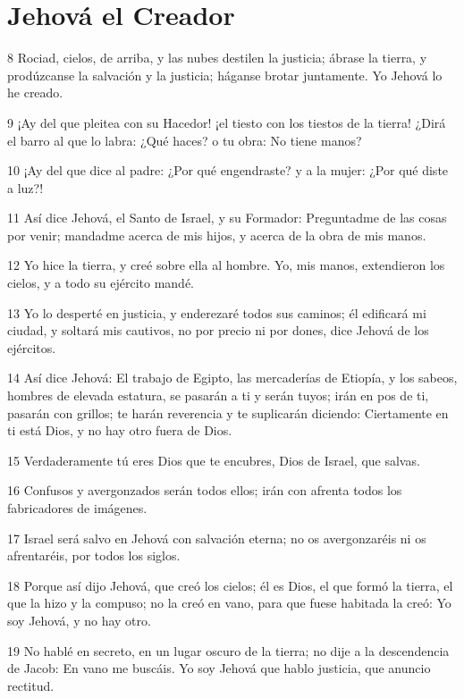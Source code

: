 \section*{Jehová el Creador}

\par 8 Rociad, cielos, de arriba, y las nubes destilen la justicia; ábrase la tierra, y prodúzcanse la salvación y la justicia; háganse brotar juntamente. Yo Jehová lo he creado.
\par 9 ¡Ay del que pleitea con su Hacedor! ¡el tiesto con los tiestos de la tierra! ¿Dirá el barro al que lo labra: ¿Qué haces? o tu obra: No tiene manos?
\par 10 ¡Ay del que dice al padre: ¿Por qué engendraste? y a la mujer: ¿Por qué diste a luz?!
\par 11 Así dice Jehová, el Santo de Israel, y su Formador: Preguntadme de las cosas por venir; mandadme acerca de mis hijos, y acerca de la obra de mis manos.
\par 12 Yo hice la tierra, y creé sobre ella al hombre. Yo, mis manos, extendieron los cielos, y a todo su ejército mandé.
\par 13 Yo lo desperté en justicia, y enderezaré todos sus caminos; él edificará mi ciudad, y soltará mis cautivos, no por precio ni por dones, dice Jehová de los ejércitos.
\par 14 Así dice Jehová: El trabajo de Egipto, las mercaderías de Etiopía, y los sabeos, hombres de elevada estatura, se pasarán a ti y serán tuyos; irán en pos de ti, pasarán con grillos; te harán reverencia y te suplicarán diciendo: Ciertamente en ti está Dios, y no hay otro fuera de Dios.
\par 15 Verdaderamente tú eres Dios que te encubres, Dios de Israel, que salvas.
\par 16 Confusos y avergonzados serán todos ellos; irán con afrenta todos los fabricadores de imágenes.
\par 17 Israel será salvo en Jehová con salvación eterna; no os avergonzaréis ni os afrentaréis, por todos los siglos.
\par 18 Porque así dijo Jehová, que creó los cielos; él es Dios, el que formó la tierra, el que la hizo y la compuso; no la creó en vano, para que fuese habitada la creó: Yo soy Jehová, y no hay otro.
\par 19 No hablé en secreto, en un lugar oscuro de la tierra; no dije a la descendencia de Jacob: En vano me buscáis. Yo soy Jehová que hablo justicia, que anuncio rectitud.


